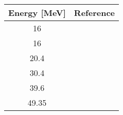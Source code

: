 \begin{tabular}{c c} 
    \toprule 
    \bf{Energy [MeV]} & \bf{Reference} \\
    \midrule
    16 & \cite{Makofske68}\\
    16 & \cite{Abbott87}\\
    20.4 & \cite{Wassenaar89}\\
    30.4 & \cite{Hardacre71}\\
    39.6 & \cite{Boyd68}\\
    49.35 & \cite{Mani71}\\
    \bottomrule
\end{tabular}
